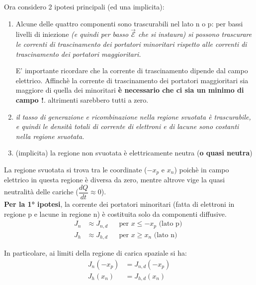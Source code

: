 Ora considero 2 ipotesi principali (ed una implicita):
\begin{enumerate}
    \item Alcune delle quattro componenti sono trascurabili nel lato n o p: per bassi livelli di iniezione \textit{(e quindi per basso $\mathcal{\vec{E}}$ che si instaura) si possono trascurare le correnti di trascinamento dei portatori minoritari rispetto alle correnti di trascinamento dei portatori maggioritari.}
    \begin{psbox}[PS]
                E' importante ricordare che la corrente di trascinamento dipende dal campo elettrico. Affinchè la corrente di trascinamento dei portatori maggioritari sia maggiore di quella dei minoritari \textbf{è necessario che ci sia un minimo di campo !}. altrimenti sarebbero tutti a zero.
            \end{psbox}
    
    \item \textit{il tasso di generazione e ricombinazione nella regione svuotata è trascurabile, e quindi le densità totali di corrente di elettroni e di lacune sono costanti nella regione svuotata.}
    
    \item (implicita) la regione non svuotata è elettricamente neutra (\textbf{o quasi neutra})
            
\end{enumerate}
La regione svuotata si trova tra le coordinate ($-x_p$ e $x_n$) poichè in campo elettrico in questa regione è diversa da zero, mentre altrove vige la quasi neutralità delle cariche ($\dfrac{dQ}{dt}\approx 0$).\\
\textbf{Per la 1° ipotesi}, la corrente dei portatori minoritari (fatta di elettroni in regione p e lacune in regione n) è costituita solo da componenti diffusive.
\begin{align*}
    J_n &\approx J_{n,d} &&\text{per } x \leq -x_p \text{ (lato p) }\\
    J_h &\approx J_{h,d} &&\text{per } x \geq x_n \text{ (lato n) }
\end{align*}
\begin{citbox}
    In particolare, ai limiti della regione di carica spaziale si ha:
    \begin{align}
        J_n(-x_p)&=J_{n,d}(-x_p)\\
        J_h(x_n) &=J_{h,d}(x_n)
    \end{align}
\end{citbox}\leavevmode\newline
